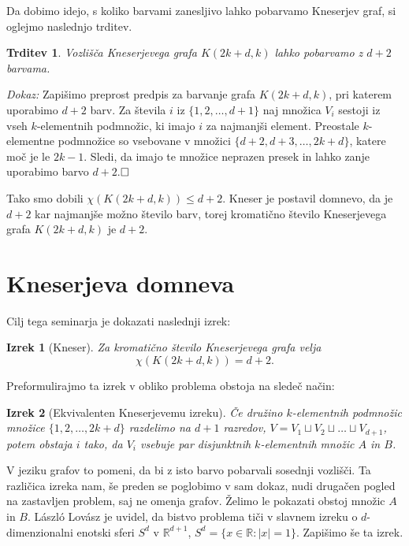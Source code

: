 \documentclass[a4paper,12pt]{article}
\def\qed{$\hfill\Box$}   %
\newtheorem{izrek}{Izrek}
\newtheorem{trditev}{Trditev}
\begin{document}
Da dobimo idejo, s koliko barvami zanesljivo lahko pobarvamo Kneserjev graf, si oglejmo naslednjo trditev.

\begin{trditev}
Vozlišča Kneserjevega grafa $K(2k+d,k)$ lahko pobarvamo z $d+2$ barvama.
\end{trditev}

\noindent
{\em Dokaz:}
Zapišimo preprost predpis za barvanje grafa $K(2k+d,k)$, pri katerem uporabimo $d+2$ barv. Za števila $i$ iz $\{1,2,\ldots,d+1\}$ naj množica $V_i$ sestoji iz vseh $k$-elementnih podmnožic, ki imajo $i$ za najmanjši element. Preostale \mbox{$k$-elementne} podmnožice so vsebovane v množici $\{d+2,d+3,\ldots,2k+d\}$, katere moč je le $2k-1$. Sledi, da imajo te množice neprazen presek in lahko zanje uporabimo barvo $d+2$.\qed

Tako smo dobili $\chi(K(2k+d,k)) \leq d+2$. Kneser je postavil domnevo, da je $d+2$ kar najmanjše možno število barv, torej kromatično število Kneserjevega grafa $K(2k+d,k)$ je $d+2$.

\newpage

\section{Kneserjeva domneva}

Cilj tega seminarja je dokazati naslednji izrek:
\begin{izrek}[Kneser]
Za kromatično število Kneserjevega grafa velja
$$\chi(K(2k+d,k)) = d+2.$$
\end{izrek}

\noindent
Preformulirajmo ta izrek v obliko problema obstoja na sledeč način:

\begin{izrek}[Ekvivalenten Kneserjevemu izreku]
Če družino $k$-elementnih podmnožic množice $\{1, 2, \ldots, 2k+d\}$ razdelimo na $d+1$ razredov,  $V = V_1 \sqcup V_2 \sqcup \ldots \sqcup V_{d+1}$, potem obstaja $i$ tako, da $V_i$ vsebuje par disjunktnih $k$-elementnih množic $A$ in $B$.
\end{izrek}

V jeziku grafov to pomeni, da bi z isto barvo pobarvali sosednji vozlišči. Ta različica izreka nam, še preden se poglobimo v sam dokaz, nudi drugačen pogled na zastavljen problem, saj ne omenja grafov. Želimo le pokazati obstoj množic $A$ in $B$. László Lovász je uvidel, da bistvo problema tiči v slavnem izreku o $d$-dimenzionalni enotski sferi $S^d$ v $\mathbb{R}^{d+1}$, $S^d = \{x \in \mathbb{R}: |x|=1\}$. Zapišimo še ta izrek.
\end{document}
